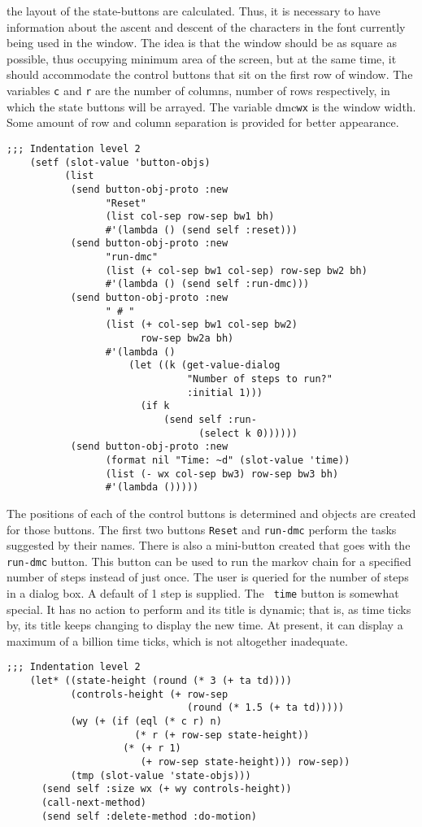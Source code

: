 the layout of the state-buttons are calculated. Thus, it is necessary
to have information about the ascent and descent of the characters in
the font currently being used in the window. The idea is
that the window should be as square as possible, thus occupying
minimum area of the screen, but at the same time, it should accommodate
the control buttons that sit on the first row of window. The variables
{\tt c} and {\tt r} are the number of columns, number of rows
respectively, in which the state buttons will be arrayed. The variable
dmc{\tt wx} is the window width. Some amount of row and column separation
is provided for better appearance. 
\begin{verbatim}
;;; Indentation level 2    
    (setf (slot-value 'button-objs)
          (list 
           (send button-obj-proto :new 
                 "Reset" 
                 (list col-sep row-sep bw1 bh)
                 #'(lambda () (send self :reset)))
           (send button-obj-proto :new 
                 "run-dmc" 
                 (list (+ col-sep bw1 col-sep) row-sep bw2 bh)
                 #'(lambda () (send self :run-dmc)))
           (send button-obj-proto :new 
                 " # " 
                 (list (+ col-sep bw1 col-sep bw2) 
                       row-sep bw2a bh)
                 #'(lambda () 
                     (let ((k (get-value-dialog 
                               "Number of steps to run?" 
                               :initial 1)))
                       (if k 
                           (send self :run- 
                                 (select k 0))))))
           (send button-obj-proto :new 
                 (format nil "Time: ~d" (slot-value 'time))
                 (list (- wx col-sep bw3) row-sep bw3 bh)
                 #'(lambda ()))))
\end{verbatim}
The positions of each of the control buttons is determined and objects
are created for those buttons.  The first two buttons {\tt Reset} and
{\tt run-dmc} perform the tasks suggested by their names. There is
also a mini-button created that goes with the {\tt run-dmc} button.
This button can be used to run the markov chain for a specified number
of steps instead of just once.  The user is queried for the number of
steps in a dialog box. A default of 1 step is supplied. The {\tt
  time} button is somewhat special. It has no action to perform and
its title is dynamic; that is, as time ticks by, its title keeps
changing to display the new time.  At present, it can display a
maximum of a billion time ticks, which is not altogether inadequate.
\begin{verbatim}
;;; Indentation level 2
    (let* ((state-height (round (* 3 (+ ta td))))
           (controls-height (+ row-sep 
                               (round (* 1.5 (+ ta td)))))
           (wy (+ (if (eql (* c r) n)
                      (* r (+ row-sep state-height))
                    (* (+ r 1) 
                       (+ row-sep state-height))) row-sep))
           (tmp (slot-value 'state-objs)))
      (send self :size wx (+ wy controls-height))
      (call-next-method)
      (send self :delete-method :do-motion)
\end{verbatim}
